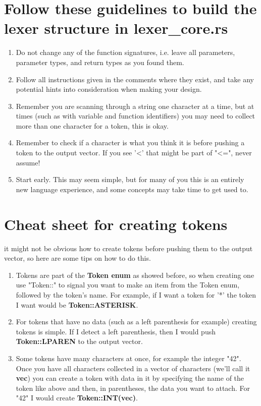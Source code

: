 \documentclass[
	12pt, %
]{fphw}
\begin{document}
\pagebreak

\section*{Follow these guidelines to build the lexer structure in lexer\_core.rs}

\begin{problem}
    \begin{enumerate}
        \item Do not change any of the function signatures, i.e. leave all parameters, parameter types, and return types as you found them.
        \item Follow all instructions given in the comments where they exist, and take any potential hints into consideration when making your design.
        \item Remember you are scanning through a string one character at a time, but at times (such as with variable and function identifiers) you may need to collect more than one character for a token, this is okay.
        \item Remember to check if a character is what you think it is before pushing a token to the output vector. If you see '<' that might be part of "<=", never assume!
        \item Start early. This may seem simple, but for many of you this is an entirely new language experience, and some concepts may take time to get used to.
        
    \end{enumerate}
\end{problem}

\section*{Cheat sheet for creating tokens}

\begin{problem}
    it might not be obvious how to create tokens before pushing them to the output vector, so here are some tips on how to do this.
    \\
    \begin{enumerate}
        \item Tokens are part of the \textbf{Token enum} as showed before, so when creating one use "Token::" to signal you want to make an item from the Token enum, followed by the token's name. For example, if I want a token for '*' the token I want would be \textbf{Token::ASTERISK}.
        \item For tokens that have no data (such as a left parenthesis for example) creating tokens is simple. If I detect a left parenthesis, then I would push \textbf{Token::LPAREN} to the output vector.
        \item Some tokens have many characters at once, for example the integer "42". Once you have all characters collected in a vector of characters (we'll call it \textbf{vec}) you can create a token with data in it by specifying the name of the token like above and then, in parentheses, the data you want to attach. For "42" I would create \textbf{Token::INT(vec)}.
    \end{enumerate}
\end{problem}

\pagebreak
\end{document}
